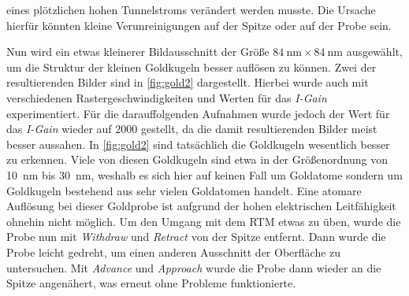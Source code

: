 eines plötzlichen hohen Tunnelstroms verändert werden musste. Die Ursache hierfür könnten kleine Verunreinigungen auf der Spitze oder auf der Probe sein.\par
Nun wird ein etwas kleinerer Bildausschnitt der Größe $\SI{84}{\nano \meter} \times \SI{84}{\nano \meter}$ ausgewählt, um die Struktur der kleinen Goldkugeln
besser auflösen zu können. Zwei der resultierenden Bilder sind in \cref{fig:gold2} dargestellt. Hierbei wurde auch mit verschiedenen Rastergeschwindigkeiten
und Werten für das \textit{I-Gain} experimentiert. Für die darauffolgenden Aufnahmen wurde jedoch der Wert für das \textit{I-Gain} wieder auf \num{2000} gestellt, da
die damit resultierenden Bilder meist besser aussahen. In \cref{fig:gold2} sind tatsächlich die Goldkugeln wesentlich besser zu erkennen. Viele von diesen
Goldkugeln sind etwa in der Größenordnung von \SI{10}{\nano \meter} bis \SI{30}{\nano \meter}, weshalb es sich hier auf keinen Fall um Goldatome sondern um Goldkugeln bestehend aus sehr
vielen Goldatomen handelt. Eine atomare Auflösung bei dieser Goldprobe ist aufgrund der hohen elektrischen Leitfähigkeit ohnehin nicht möglich. Um den Umgang
mit dem RTM etwas zu üben, wurde die Probe nun mit \textit{Withdraw} und \textit{Retract} von der Spitze entfernt. Dann wurde die Probe leicht gedreht, um
einen anderen Ausschnitt der Oberfläche zu untersuchen. Mit \textit{Advance} und \textit{Approach} wurde die Probe dann wieder an die Spitze angenähert, was
erneut ohne Probleme funktionierte.
